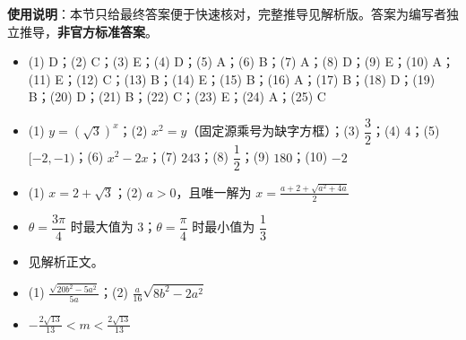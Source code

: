 
\begin{gknotice}
\textbf{使用说明}：本节只给最终答案便于快速核对，完整推导见解析版。答案为编写者独立推导，\textbf{非官方标准答案}。
\end{gknotice}

\begin{itemize}[leftmargin=2.6em]
  \item[\textbf{1.}] (1) D；(2) C；(3) E；(4) D；(5) A；(6) B；(7) A；(8) D；(9) E；(10) A；(11) E；(12) C；(13) B；(14) E；(15) B；(16) A；(17) B；(18) D；(19) B；(20) D；(21) B；(22) C；(23) E；(24) A；(25) C
  \item[\textbf{2.}] (1) $y=(\sqrt3)^x$；(2) $x^2=y$（固定源乘号为缺字方框）；(3) $\dfrac32$；(4) $4$；(5) $[-2,-1)$；(6) $x^2-2x$；(7) $243$；(8) $\dfrac12$；(9) $180$；(10) $-2$
  \item[\textbf{3.}] (1) $x=2+\sqrt3$；(2) $a>0$，且唯一解为 $\displaystyle x=\frac{a+2+\sqrt{a^2+4a}}2$
  \item[\textbf{4.}] $\theta=\dfrac{3\pi}4$ 时最大值为 $3$；$\theta=\dfrac\pi4$ 时最小值为 $\dfrac13$
  \item[\textbf{5.}] 见解析正文。
  \item[\textbf{6.}] (1) $\displaystyle \frac{\sqrt{20b^2-5a^2}}{5a}$；(2) $\displaystyle \frac a{16}\sqrt{8b^2-2a^2}$
  \item[\textbf{7.}] $\displaystyle -\frac{2\sqrt{13}}{13}<m<\frac{2\sqrt{13}}{13}$
\end{itemize}
